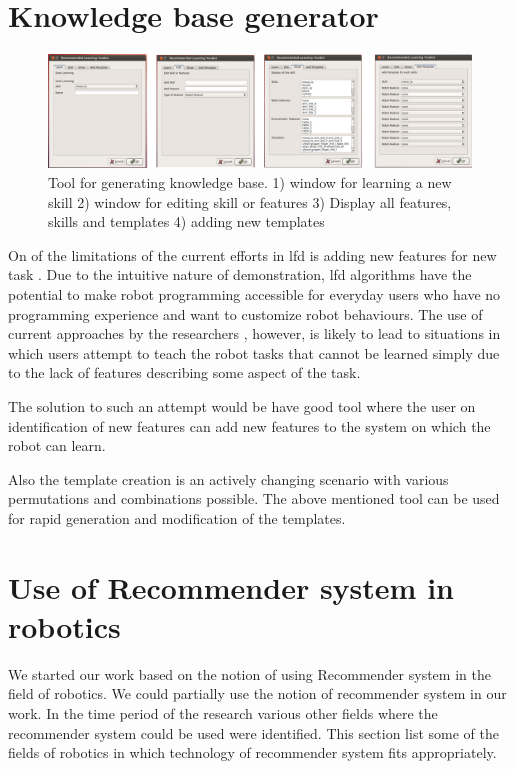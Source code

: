 \section{Knowledge base generator}
\label{knowledge base generator}
\begin{figure}[htp]
\centering
\includegraphics[scale=0.5]{images/tool/tool.png}
\caption[Tool for generating knowledge base]{Tool for generating knowledge base. 1) window for learning a new skill
2) window for editing skill or features 3) Display all features, skills and
templates 4) adding new templates}
\label{}
\end{figure}

On of the limitations of the current efforts in \acrshort{lfd} is adding new features for
new task \cite {argall_survey_2009}. Due to the intuitive nature of
demonstration, \acrshort{lfd} algorithms have the potential to make robot programming
accessible for everyday users who have no programming experience and want to
customize robot behaviours. The use of current approaches by the researchers
, however, is likely to lead to situations in which users attempt to
teach the robot tasks that cannot be learned simply due to the lack of features
describing some aspect of the task.

The solution to such an attempt would be have good tool where the user on 
identification of new features can add new features to the system on which 
the robot can learn.

Also the template creation is an actively changing scenario with various permutations
and combinations possible. The above mentioned tool can be used for rapid 
generation and modification of the templates.


\newpage
\section{Use of Recommender system in robotics}
We started our work based on the notion of using Recommender system in the 
field of robotics. We could partially use the notion of recommender system 
in our work. In the time period of the research various other fields where
the recommender system could be used were identified.
This section list some of the fields of robotics in which technology of 
recommender system fits appropriately.


